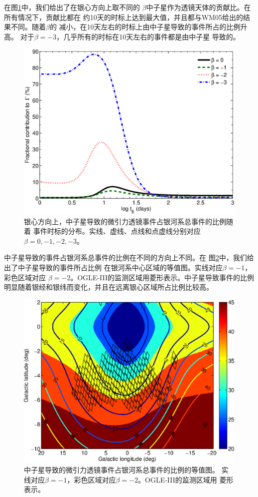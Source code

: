 在图\ref{ratio_beta}中，我们给出了在银心方向上取不同的
$\beta$中子星作为透镜天体的贡献比。在所有情况下，贡献比都在
约10天的时标上达到最大值，并且都与WM05给出的结果不同。随着$\beta$的
减小，在10天左右的时标上由中子星导致的事件所占的比例升高。
对于$\beta=-3$，几乎所有的时标在10天左右的事件都是由中子星
导致的。
%
\begin{figure}
\begin{center}
  \includegraphics[width=4 in,trim=0 0 0 3cm]{ratio_beta.eps}
%
\caption{银心方向上，中子星导致的微引力透镜事件占银河系总事件的比例随着
事件时标的分布。实线、虚线、点线和点虚线分别对应$\beta=0,-1,-2,-3$。}
\label{ratio_beta}
\end{center}
\end{figure}
%

中子星导致的事件占银河系总事件的比例在不同的方向上不同。在
图\ref{map_percentage}中，我们给出了中子星导致的事件所占比例
在银河系中心区域的等值图。实线对应$\beta=-1$，彩色区域对应
$\beta=-2$。OGLE-III的监测区域用菱形表示。中子星导致事件的比例
明显随着银经和银纬而变化，并且在远离银心区域所占比例比较高。
%
\begin{figure}
\begin{center}
  \includegraphics[width=4 in,trim=0 0 0 3cm]{map_percentage.eps}
%
\caption{中子星导致的微引力透镜事件占银河系总事件的比例的等值图。
实线对应$\beta=-1$，彩色区域对应$\beta=-2$。OGLE-III的监测区域用
菱形表示。}
\label{map_percentage}
\end{center}
\end{figure}
%

